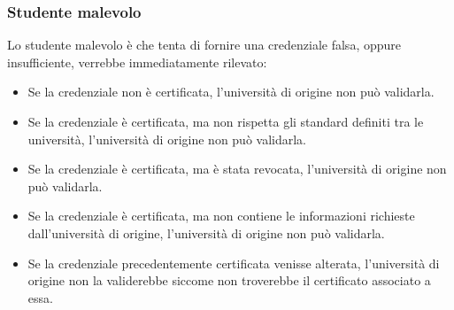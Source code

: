\documentclass[a4paper,12pt]{article}
\begin{document}
\subsubsection{Studente malevolo}
Lo studente malevolo è che tenta di fornire una credenziale falsa, oppure insufficiente, verrebbe immediatamente rilevato: 
\begin{itemize}
    \item Se la credenziale non è certificata, l'università di origine non può validarla.
    \item Se la credenziale è certificata, ma non rispetta gli standard definiti tra le università, l'università di origine non può validarla.
    \item Se la credenziale è certificata, ma è stata revocata, l'università di origine non può validarla.
    \item Se la credenziale è certificata, ma non contiene le informazioni richieste dall'università di origine, l'università di origine non può validarla.
    \item Se la credenziale precedentemente certificata venisse alterata, l'università di origine non la validerebbe siccome non troverebbe il certificato associato a essa.
\end{itemize}
\end{document}
